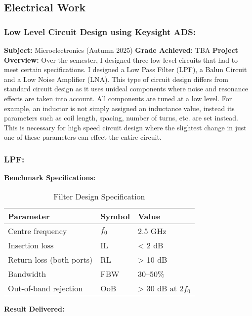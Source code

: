 \subsection{Electrical Work}

\subsubsection{Low Level Circuit Design using Keysight ADS:}
\textbf{Subject: } Microelectronics (Autumn 2025) \newline
\textbf{Grade Achieved: } TBA \newline
\textbf{Project Overview: }
Over the semester, I designed three low level circuits that had to meet certain specifications. I designed a Low Pass Filter (LPF), a Balun Circuit and a Low Noise Amplifier (LNA).
This type of circuit design differs from standard circuit design as it uses unideal components where noise and resonance effects are taken into account. All components are tuned at
a low level. For example, an inductor is not simply assigned an inductance value, instead its parameters such as coil length, spacing, number of turns, etc. are set instead. This is necessary 
for high speed circuit design where the slightest change in just one of these parameters can effect the entire circuit. 

\subsubsection{LPF:}

\textbf{Benchmark Specifications: }

\begin{table}[htbp]
\centering
\begin{tabularx}{\textwidth}{@{} l l X @{}}
\toprule
\textbf{Parameter} & \textbf{Symbol} & \textbf{Value} \\
\midrule
Centre frequency & $f_0$ & 2.5 GHz \\
Insertion loss & IL & < 2 dB \\
Return loss (both ports) & RL & > 10 dB \\
Bandwidth & FBW & 30–50\% \\
Out-of-band rejection & OoB & > 30 dB at $2f_0$ \\
\bottomrule
\end{tabularx}
\caption{Filter Design Specification}
\end{table}

\newpage
\textbf{Result Delivered: }

